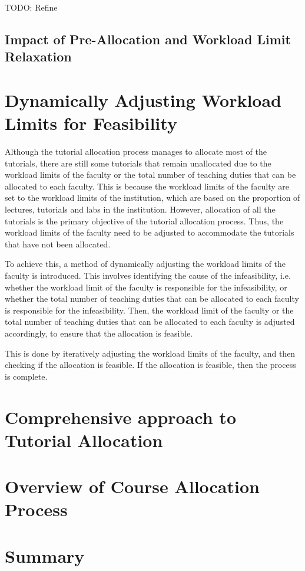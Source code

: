 TODO: Refine

\subsection{Impact of Pre-Allocation and Workload Limit Relaxation}

\section{Dynamically Adjusting Workload Limits for Feasibility}



Although the tutorial allocation process manages to allocate most of the tutorials, there are still some tutorials that remain unallocated due to the workload limits of the faculty or the total number of teaching duties that can be allocated to each faculty. This is because the workload limits of the faculty are set to the workload limits of the institution, which are based on the proportion of lectures, tutorials and labs in the institution. However, allocation of all the tutorials is the primary objective of the tutorial allocation process. Thus, the workload limits of the faculty need to be adjusted to accommodate the tutorials that have not been allocated.

To achieve this, a method of dynamically adjusting the workload limits of the faculty is introduced. This involves identifying the cause of the infeasibility, i.e. whether the workload limit of the faculty is responsible for the infeasibility, or whether the total number of teaching duties that can be allocated to each faculty is responsible for the infeasibility. Then, the workload limit of the faculty or the total number of teaching duties that can be allocated to each faculty is adjusted accordingly, to ensure that the allocation is feasible.

This is done by iteratively adjusting the workload limits of the faculty, and then checking if the allocation is feasible. If the allocation is feasible, then the process is complete.

\section{Comprehensive approach to Tutorial Allocation}


\section{Overview of Course Allocation Process}


\section{Summary}

